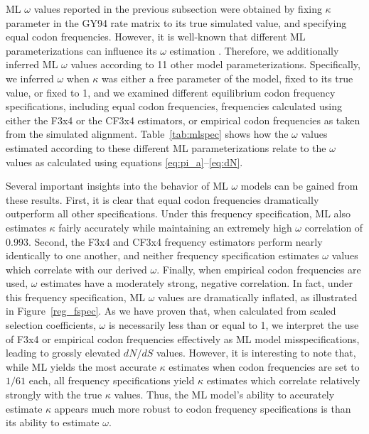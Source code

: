 \documentclass[11pt]{article}
\begin{document}
ML $\omega$ values reported in the previous subsection were obtained by fixing $\kappa$ parameter in the GY94 rate matrix to its true simulated value, and specifying equal codon frequencies. However, it is well-known that different ML parameterizations can influence its $\omega$ estimation \cite{YN00,Yang2006,ZhangYu2006}.  Therefore, we additionally inferred ML $\omega$ values according to 11 other model parameterizations. Specifically, we inferred $\omega$ when $\kappa$ was either a free parameter of the model, fixed to its true value, or fixed to 1, and we examined different equilibrium codon frequency specifications, including equal codon frequencies, frequencies calculated using either the F3x4 \cite{MuseGaut1994} or the CF3x4 \cite{Pond2010} estimators, or empirical codon frequencies as taken from the simulated alignment. Table~\ref{tab:mlspec} shows how the $\omega$ values estimated according to these different ML parameterizations relate to the $\omega$ values as calculated using equations \eqref{eq:pi_a}--\eqref{eq:dN}. 

Several important insights into the behavior of ML $\omega$ models can be gained from these results. First, it is clear that equal codon frequencies dramatically outperform all other specifications. Under this frequency specification, ML also estimates $\kappa$ fairly accurately while maintaining an extremely high $\omega$ correlation of 0.993. Second, the F3x4 and CF3x4 frequency estimators perform nearly identically to one another, and neither frequency specification estimates $\omega$ values which correlate with our derived $\omega$. Finally, when empirical codon frequencies are used, $\omega$ estimates have a moderately strong, negative correlation. In fact, under this frequency specification, ML $\omega$ values are dramatically inflated, as illustrated in Figure~\ref{reg_fspec}. As we have proven that, when calculated from scaled selection coefficients, $\omega$ is necessarily less than or equal to 1, we interpret the use of F3x4 or empirical codon frequencies effectively as ML model misspecifications, leading to grossly elevated $dN/dS$ values. However, it is interesting to note that, while ML yields the most accurate $\kappa$ estimates when codon frequencies are set to $1/61$ each, all frequency specifications yield $\kappa$ estimates which correlate relatively strongly with the true $\kappa$ values. Thus, the ML model's ability to accurately estimate $\kappa$ appears much more robust to codon frequency specifications is than its ability to estimate $\omega$.
\end{document}
